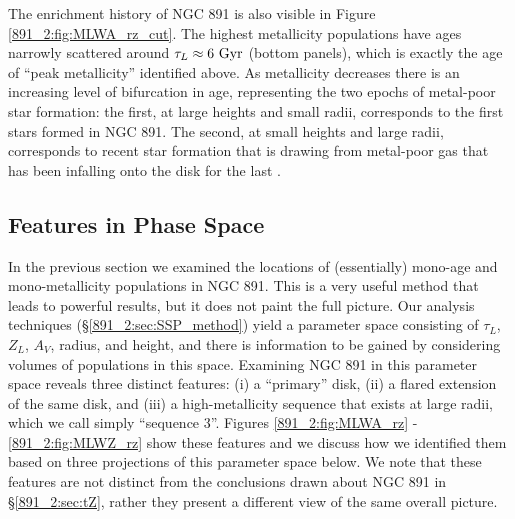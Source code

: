 The enrichment history of NGC 891 is also visible in Figure
\ref{891_2:fig:MLWA_rz_cut}. The highest metallicity populations have
ages narrowly scattered around $\tau_L \approx 6~\mathrm{Gyr} $ (bottom
panels), which is exactly the age of ``peak metallicity'' identified
above. As metallicity decreases there is an increasing level of
bifurcation in age, representing the two epochs of metal-poor star
formation: the first, at large heights and small radii, corresponds to
the first stars formed in NGC 891. The second, at small heights and
large radii, corresponds to recent star formation that is drawing from
metal-poor gas that has been infalling onto the disk for the last
.

\subsection{Features in Phase Space}
\label{891_2:sec:rz}

In the previous section we examined the locations of (essentially)
mono-age and mono-metallicity populations in NGC 891. This is a very
useful method that leads to powerful results, but it does not paint
the full picture.  Our analysis techniques
(\S\ref{891_2:sec:SSP_method}) yield a parameter space consisting of
$\tau_L$, $Z_L$, $A_V$, radius, and height, and there is information
to be gained by considering volumes of populations in this
space. Examining NGC 891 in this parameter space reveals three
distinct features: (i) a ``primary'' disk, (ii) a flared extension of
the same disk, and (iii) a high-metallicity sequence that exists at
large radii, which we call simply ``sequence 3''. Figures
\ref{891_2:fig:MLWA_rz} - \ref{891_2:fig:MLWZ_rz} show these features
and we discuss how we identified them based on three projections of
this parameter space below. We note that these features are not
distinct from the conclusions drawn about NGC 891 in
\S\ref{891_2:sec:tZ}, rather they present a different view of the same
overall picture.



